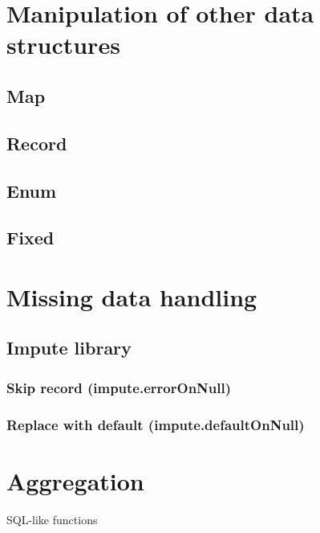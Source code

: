 \documentclass{article}
\theoremstyle{definition}
\begin{document}
\pagebreak

\section{Manipulation of other data structures}

\subsection{Map}

\subsection{Record}

\subsection{Enum}

\subsection{Fixed}

\pagebreak

\section{Missing data handling}

\hypertarget{hsec:impute}{}
\subsection{Impute library}
\label{sec:impute}

\subsubsection{Skip record (impute.errorOnNull)}

\subsubsection{Replace with default (impute.defaultOnNull)}

\pagebreak

\section{Aggregation}

SQL-like functions
\end{document}
